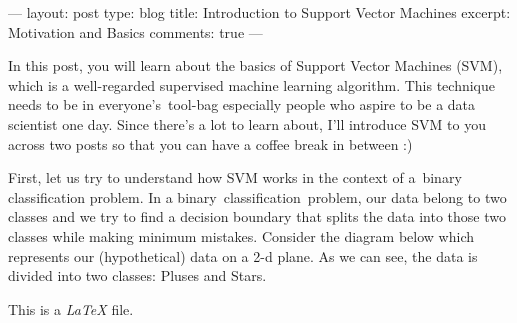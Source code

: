 ---
layout: post
type: blog
title: Introduction to Support Vector Machines
excerpt: Motivation and Basics
comments: true
---

In this post, you will learn about the basics of Support Vector Machines (SVM), which is a well-regarded supervised machine learning algorithm. This technique needs to be in everyone's tool-bag especially people who aspire to be a data scientist one day. Since there's a lot to learn about, I'll introduce SVM to you across two posts so that you can have a coffee break in between :)

First, let us try to understand how SVM works in the context of a binary classification problem. In a binary classification problem, our data belong to two classes and we try to find a decision boundary that splits the data into those two classes while making minimum mistakes. Consider the diagram below which represents our (hypothetical) data on a 2-d plane. As we can see, the data is divided into two classes: Pluses and Stars.

This is a \emph{LaTeX} file.
